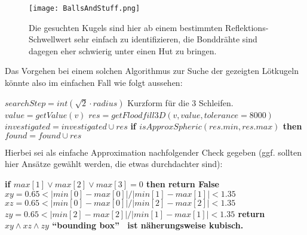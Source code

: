 \begin{figure}[H]
  \begin{center}
    \texttt{[image: BallsAndStuff.png]}
    \caption{Die gesuchten Kugels sind hier ab einem bestimmten Reflektions-Schwellwert sehr einfach zu identifizieren, die Bonddrähte sind dagegen eher schwierig unter einen Hut zu bringen.}
    \label{fig:BallsAndStuff}
  \end{center}
\end{figure}
\newpage
Das Vorgehen  bei einem solchen Algorithmus zur Suche der gezeigten Lötkugeln könnte also im einfachen Fall wie folgt aussehen:
\newline
\begin{algorithmic}
\State $searchStep = int(\sqrt{2} \cdot radius)$
 \Comment \textnormal{Kurzform für die 3 Schleifen.} 
   \State $value = getValue(v)$
           \State $res = getFloodfill3D(v, value, tolerance = 8000)$
           \State $investigated = investigated \cup res$
           \State \bf{if} $isApproxSpheric(res.min, res.max)$ \bf{then} $found = found \cup res$  
       \EndIf
   \EndIf
\EndFor
\EndProcedure \newline
\end{algorithmic}

Hierbei sei als einfache Approximation nachfolgender Check gegeben (ggf. sollten hier Ansätze gewählt werden, die etwas durchdachter sind):
\newline
\begin{algorithmic}
\State \bf{if} $max[1] \lor max[2] \lor max[3] = 0$ \bf{then return} \textnormal{False}
\State $xy = 0.65 < |min[0]-max[0]|/|min[1]-max[1]| < 1.35$
\State $xz = 0.65 < |min[0]-max[0]|/|min[2]-max[2]| < 1.35$
\State $zy = 0.65 < |min[2]-max[2]|/|min[1]-max[1]| < 1.35$
\State \bf{return} $xy \land xz \land zy$ \Comment \textnormal{"`bounding box"' \ ist näherungsweise kubisch.}
\EndProcedure \newline
\end{algorithmic}

